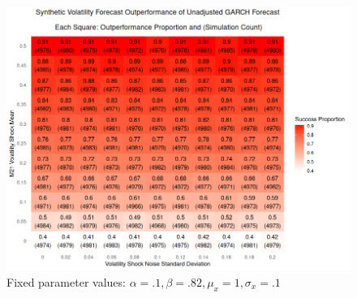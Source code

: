 \documentclass[9pt]{beamer}
\theoremstyle{definition}
\begin{document}
\begin{frame}
    \fontsize{8pt}{9pt}
    
    \begin{figure}[h!]
      \begin{center}
        \includegraphics[scale=.29]{simulation_plots/standard_simulation_alpha_.1_beta_.82.png}
        \caption{Fixed parameter values: $\alpha = .1, \beta = .82, \mu_{x} = 1, \sigma_{x} = .1$}\label{fig:heavy_beta}
      \end{center}
      \end{figure}

\end{frame}
\end{document}
